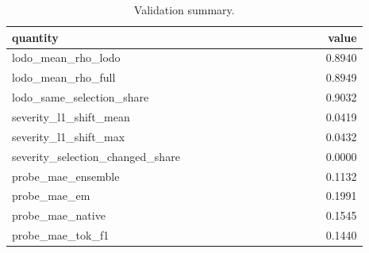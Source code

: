 \begin{table}[htbp]
\centering\scriptsize
\caption{Validation summary.}
\label{tab:validation}
\setlength{\tabcolsep}{3pt}
\begin{tabular}{p{0.892\linewidth}r}
\toprule
quantity & value \\
\midrule
lodo\_\allowbreak{}mean\_\allowbreak{}rho\_\allowbreak{}lodo & 0.8940 \\
lodo\_\allowbreak{}mean\_\allowbreak{}rho\_\allowbreak{}full & 0.8949 \\
lodo\_\allowbreak{}same\_\allowbreak{}selection\_\allowbreak{}share & 0.9032 \\
severity\_\allowbreak{}l1\_\allowbreak{}shift\_\allowbreak{}mean & 0.0419 \\
severity\_\allowbreak{}l1\_\allowbreak{}shift\_\allowbreak{}max & 0.0432 \\
severity\_\allowbreak{}selection\_\allowbreak{}changed\_\allowbreak{}share & 0.0000 \\
probe\_\allowbreak{}mae\_\allowbreak{}ensemble & 0.1132 \\
probe\_\allowbreak{}mae\_\allowbreak{}em & 0.1991 \\
probe\_\allowbreak{}mae\_\allowbreak{}native & 0.1545 \\
probe\_\allowbreak{}mae\_\allowbreak{}tok\_\allowbreak{}f1 & 0.1440 \\
\bottomrule
\end{tabular}
\end{table}
